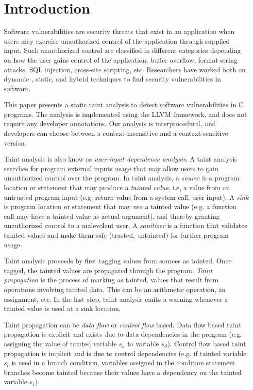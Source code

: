 \section{Introduction}
Software vulnerabilities are security threats
that exist in an application when users may exercise
unauthorized  control of the application through supplied input.
Such unauthorized control are classified in different
categories depending on how the user gains control of
the application: buffer overflow, format string attacks,
SQL injection, cross-site scripting, etc.
Researchers have worked both on dynamic \cite{Clause:2007:Dytan,
Kiezun:2009:Ardilla}, static\cite{Tripp:2009:TAJ, Kiezun:2009:Ardilla,
Chang:2009:ICS, Parfait:2008, Jovanovic:2006:Pixy, livshits05finding,
Avots:2005:ISS, Shankar:2001:DFS}, and hybrid
techniques\cite{Trip:2011:HAJSA} to find  security
vulnerabilities in software. 

This paper presents a static taint analysis to detect software
vulnerabilities in C programs. The analysis is implemented
using the LLVM framework\cite{Lattner:2004:LLVM}, and does
not require any developer annotations. Our analysis
is interprocedural, and developers can choose between a
context-insensitive and a context-sensitive version. 

Taint analysis is also know as \textit{user-input dependence analysis}.
A taint analysis searches for program external inputs usage that
may allow users to gain unauthorized control over the program. 
In taint analysis, a \textit{source} is a program location
or statement that may produce a \textit{tainted value}, i.e,
a value from an untrusted program input (e.g. return value from a
system call, user input). 
A \textit{sink} is program location or statement that may use
a tainted value (e.g. a function call may have a tainted value as
actual argument), and thereby granting unauthorized control
to a malevolent user.
A \textit{sanitizer} is a function that validates tainted
values and make them safe (trusted, untainted) for further
program usage.

Taint analysis proceeds by first tagging values from sources
as tainted. Once tagged, the tainted values are propagated
through the program.
\textit{Taint propagation} is the process of marking as tainted, 
values that result from operations involving tainted data. This
can be an arithmetic operation, an assignment, etc. In the
last step, taint analysis emits a warning whenever a tainted
value is used at a sink location.

Taint propagation can be \textit{data flow} or \textit{control flow}
based. Data flow based taint propagation is explicit and exists
due to data dependencies in the program (e.g. assigning the value
of tainted variable $s_u$ to variable $s_d$).
Control flow based taint propagation is implicit and is due to
control dependencies (e.g. if tainted variable $s_t$ is used in a branch
condition, variables assigned in the condition statement branches
become tainted because their values have a dependency on the
tainted variable $s_t$).

